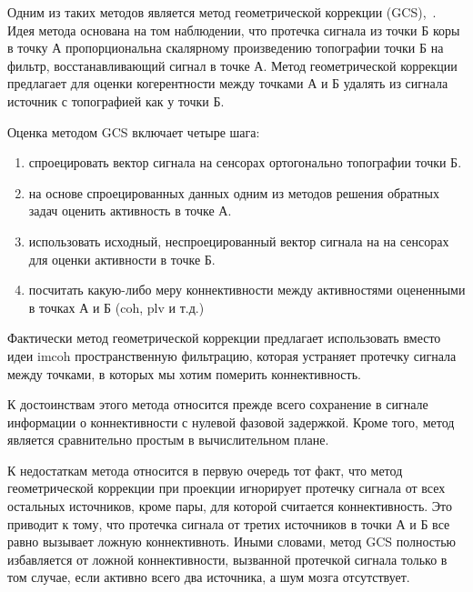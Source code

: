 Одним из таких методов является метод геометрической коррекции
(GCS),~\cite{Wens2015}. Идея метода основана на том наблюдении, что протечка
сигнала из точки Б коры в точку А пропорциональна скалярному произведению
топографии точки Б на фильтр, восстанавливающий сигнал в точке А. Метод
геометрической коррекции предлагает для оценки когерентности между точками А и
Б удалять из сигнала источник с топографией как у точки Б.

Оценка методом GCS включает четыре шага:

\begin{enumerate}
    \item спроецировать вектор сигнала на сенсорах ортогонально
        топографии точки Б.
    \item на основе спроецированных данных одним из методов решения
        обратных задач оценить активность в точке А.
    \item использовать исходный, неспроецированный вектор сигнала на на сенсорах
        для оценки активности в точке Б.
    \item посчитать какую-либо меру коннективности между активностями
        оцененными в точках А и Б (coh, plv и т.д.)
\end{enumerate}

Фактически метод геометрической коррекции предлагает использовать вместо идеи
imcoh пространственную фильтрацию, которая устраняет протечку сигнала между
точками, в которых мы хотим померить коннективность.

К достоинствам этого метода относится прежде всего сохранение в сигнале
информации о коннективности с нулевой фазовой задержкой. Кроме того, метод
является сравнительно простым в вычислительном плане.

К недостаткам метода относится в первую очередь тот факт, что метод
геометрической коррекции при проекции игнорирует протечку сигнала от всех
остальных источников, кроме пары, для которой считается коннективность. Это
приводит к тому, что протечка сигнала от третих источников в точки А и Б все
равно вызывает ложную коннективноть.  Иными словами, метод GCS полностью
избавляется от ложной коннективности, вызванной протечкой сигнала только в том
случае, если активно всего два источника, а шум мозга отсутствует.
